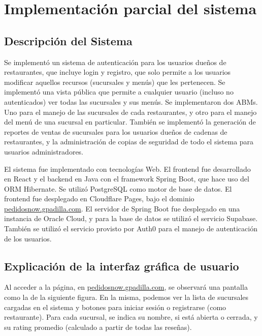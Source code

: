 \section{Implementación parcial del sistema}

\subsection{Descripción del Sistema}

Se implementó un sistema de autenticación para los usuarios dueños de restaurantes, que incluye login y registro, que solo permite a los usuarios modificar aquellos recursos (sucursales y menús) que les pertenecen. Se implementó una vista pública que permite a cualquier usuario (incluso no autenticados) ver todas las sucursales y sus menús. Se implementaron dos ABMs. Uno para el manejo de las sucursales de cada restaurantes, y otro para el manejo del menú de una sucursal en particular. También se implementó la generación de reportes de ventas de sucursales para los usuarios dueños de cadenas de restaurantes, y la administración de copias de seguridad de todo el sistema para usuarios administradores.

El sistema fue implementado con tecnologías Web. El frontend fue desarrollado en React y el backend en Java con el framework Spring Boot, que hace uso del ORM Hibernate. Se utilizó PostgreSQL como motor de base de datos. El frontend fue desplegado en Cloudflare Pages, bajo el dominio \href{https://pedidosnow.gpadilla.com}{pedidosnow.gpadilla.com}. El servidor de Spring Boot fue desplegado en una instancia de Oracle Cloud, y para la base de datos se utilizó el servicio Supabase. También se utilizó el servicio provisto por Auth0 para el manejo de autenticación de los usuarios.

\subsection{Explicación de la interfaz gráfica de usuario}

Al acceder a la página, en \href{https://pedidosnow.gpadilla.com}{pedidosnow.gpadilla.com}, se observará una pantalla como la de la siguiente figura. En la misma, podemos ver la lista de sucursales cargadas en el sistema y botones para iniciar sesión o registrarse (como restaurante). Para cada sucursal, se indica su nombre, si está abierta o cerrada, y su rating promedio (calculado a partir de todas las reseñas).

